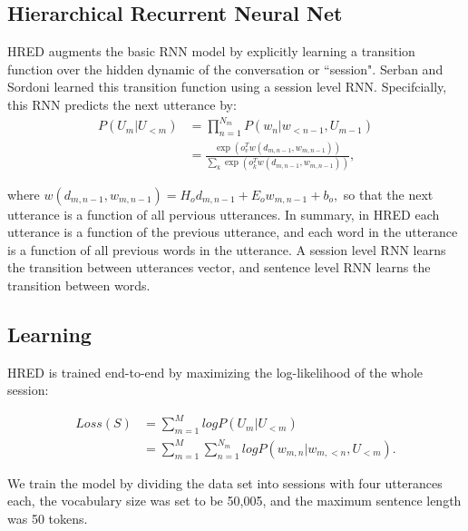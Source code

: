 \subsection{Hierarchical Recurrent Neural Net}

HRED augments the basic RNN model by explicitly learning a transition function over the hidden dynamic of the conversation or  ``session". Serban and Sordoni learned this transition function using a session level RNN. Specifcially, this RNN predicts the next utterance by:
    \begin{align*}
        P(U_m|U_{<m}) &= \prod_{n=1}^{N_m} P(w_n | w_{<n-1}, U_{m-1}) \\
                      &= \frac{\exp(o_{v}^T w(d_{m,n-1}, w_{{m,n-1}}))}{\sum_{k} \exp(o_{k}^Tw(d_{m,n-1}, w_{m,n-1}))},
    \end{align*}

where $w(d_{m,n-1}, w_{m,n-1}) = H_o d_{m,n-1} + E_o w_{m,n-1} + b_o,$ so that the next utterance is a function of all pervious utterances. In summary, in HRED each utterance is a function of the previous utterance, and each word in the utterance is a function of all previous words in the utterance. A session level RNN learns the transition between utterances vector, and sentence level RNN learns the transition between words. 

\subsection{Learning}

HRED is trained end-to-end by maximizing the log-likelihood of the whole session:

    \begin{align*}
        Loss(S) &= \sum_{m=1}^M log P(U_m|U_{<m}) \\
                &= \sum_{m=1}^M \sum_{n=1}^{N_m} log P(w_{m,n} | w_{m,<n}, U_{<m}).
    \end{align*}

We train the model by dividing the data set into sessions with four utterances each, the vocabulary size was set to be 50,005, and the maximum sentence length was 50 tokens.



































